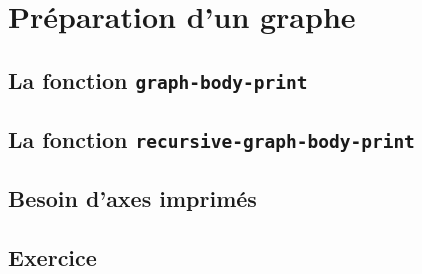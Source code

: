 \chapter{Préparation d'un graphe}

\section{La fonction \texttt{graph-body-print}}

\section{La fonction \texttt{recursive-graph-body-print}}

\section{Besoin d'axes imprimés}

\section{Exercice}